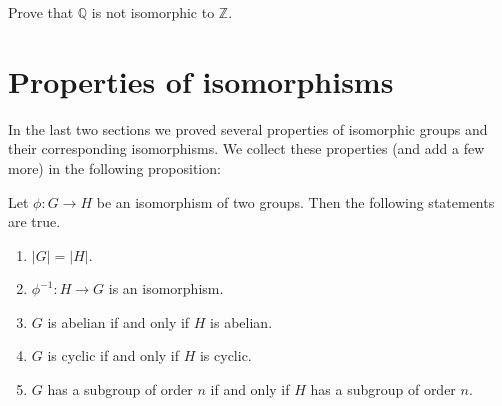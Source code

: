 \begin{exercise}\label{exercise:isomorph:noniso_cyclic}
Prove that ${\mathbb Q}$ is not isomorphic to ${\mathbb Z}$.
\end{exercise}

\section{Properties of isomorphisms}\label{iso_properties}
In the last two sections we  proved several properties of isomorphic groups and their corresponding isomorphisms.  We collect these properties (and add a few more) in the following proposition:

\begin{thm}\label{isomorph_theorem_1}
Let $\phi : G \rightarrow H$ be an isomorphism of two groups.  Then the following statements are true. 
\begin{enumerate}[(1)]
 

\rm \item 
$|G| = |H|$. 

\rm \item 
$\phi^{-1} : H \rightarrow G$ is an isomorphism. 

\rm \item 
$G$ is abelian if and only if $H$ is abelian. 

\rm \item 
$G$ is cyclic if and only if $H$ is cyclic. 

\rm \item 
$G$ has a subgroup of order $n$ if and only if $H$ has a subgroup of order $n$.
 
\end{enumerate}
\end{thm}

